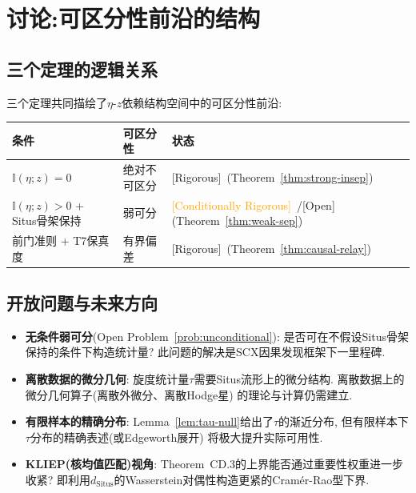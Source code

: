 \documentclass[12pt,a4paper]{article}
\newcommand{\rigorous}{\textcolor{green!50!black}{\small\textsf{[Rigorous]}}}
\newcommand{\conditionallyrigorous}{\textcolor{orange}{\small\textsf{[Conditionally Rigorous]}}}
\newcommand{\openquest}{\textcolor{red!70!black}{\small\textsf{[Open]}}}
\newcommand{\I}{\mathbb{I}}
\newcommand{\Situs}{\mathrm{Situs}}
\begin{document}
\section{讨论:可区分性前沿的结构}
\label{sec:discussion}

\subsection{三个定理的逻辑关系}

三个定理共同描绘了$\eta$-$z$依赖结构空间中的可区分性前沿:

\begin{center}
\begin{tabular}{@{}lll@{}}
\toprule
\textbf{条件} & \textbf{可区分性} & \textbf{状态} \\
\midrule
$\I(\eta; z) = 0$ & 绝对不可区分 & \rigorous~(Theorem~\ref{thm:strong-insep}) \\
$\I(\eta; z) > 0$ + Situs骨架保持 & 弱可分 & \conditionallyrigorous~/\openquest~
(Theorem~\ref{thm:weak-sep}) \\
前门准则 + T7保真度 & 有界偏差 & \rigorous~(Theorem~\ref{thm:causal-relay}) \\
\bottomrule
\end{tabular}
\end{center}

\subsection{开放问题与未来方向}

\begin{itemize}
    \item \textbf{无条件弱可分}(Open Problem~\ref{prob:unconditional}):
    是否可在不假设Situs骨架保持的条件下构造统计量?
    此问题的解决是SCX因果发现框架下一里程碑.

    \item \textbf{离散数据的微分几何}:
    旋度统计量$\tau$需要Situs流形上的微分结构.
    离散数据上的微分几何算子(离散外微分、离散Hodge星)
    的理论与计算仍需建立.

    \item \textbf{有限样本的精确分布}:
    Lemma~\ref{lem:tau-null}给出了$\tau$的渐近分布,
    但有限样本下$\tau$分布的精确表述(或Edgeworth展开)
    将极大提升实际可用性.

    \item \textbf{KLIEP(核均值匹配)视角}:
    Theorem~CD.3的上界能否通过重要性权重进一步收紧?
    即利用$d_{\Situs}$的Wasserstein对偶性构造更紧的Cram\'er-Rao型下界.
\end{itemize}
\end{document}
